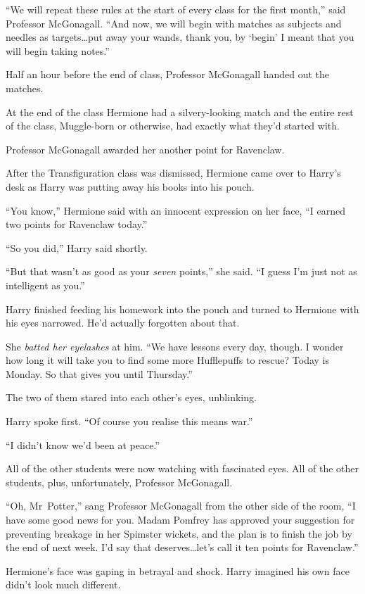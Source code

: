 “We will repeat these rules at the start of every class for the first month,” said Professor McGonagall. “And now, we will begin with matches as subjects and needles as targets…put away your wands, thank you, by ‘begin’ I meant that you will begin taking notes.”

Half an hour before the end of class, Professor McGonagall handed out the matches.

At the end of the class Hermione had a silvery-looking match and the entire rest of the class, Muggle-born or otherwise, had exactly what they’d started with.

Professor McGonagall awarded her another point for Ravenclaw.

\later

After the Transfiguration class was dismissed, Hermione came over to Harry’s desk as Harry was putting away his books into his pouch.

“You know,” Hermione said with an innocent expression on her face, “I earned two points for Ravenclaw today.”

“So you did,” Harry said shortly.

“But that wasn’t as good as your \emph{seven} points,” she said. “I guess I’m just not as intelligent as you.”

Harry finished feeding his homework into the pouch and turned to Hermione with his eyes narrowed. He’d actually forgotten about that.

She \emph{batted her eyelashes} at him. “We have lessons every day, though. I wonder how long it will take you to find some more Hufflepuffs to rescue? Today is Monday. So that gives you until Thursday.”

The two of them stared into each other’s eyes, unblinking.

Harry spoke first. “Of course you realise this means war.”

“I didn’t know we’d been at peace.”

All of the other students were now watching with fascinated eyes. All of the other students, plus, unfortunately, Professor McGonagall.

“Oh, Mr~Potter,” sang Professor McGonagall from the other side of the room, “I have some good news for you. Madam Pomfrey has approved your suggestion for preventing breakage in her Spimster wickets, and the plan is to finish the job by the end of next week. I’d say that deserves…let’s call it ten points for Ravenclaw.”

Hermione’s face was gaping in betrayal and shock. Harry imagined his own face didn’t look much different.

